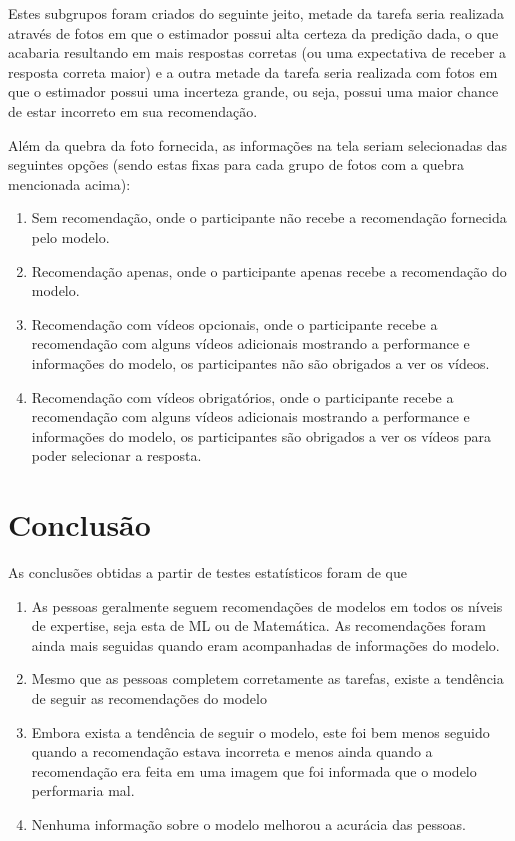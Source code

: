 \documentclass{article}
\begin{document}
Estes subgrupos foram criados do seguinte jeito, metade da tarefa seria realizada através de fotos em que o estimador possui alta certeza da predição dada, o que acabaria resultando em mais respostas corretas (ou uma expectativa de receber a resposta correta maior) e a outra metade da tarefa seria realizada com fotos em que o estimador possui uma incerteza grande, ou seja, possui uma maior chance de estar incorreto em sua recomendação.

Além da quebra da foto fornecida, as informações na tela seriam selecionadas das seguintes opções (sendo estas fixas para cada grupo de fotos com a quebra mencionada acima): 
\begin{enumerate}
    \item Sem recomendação, onde o participante não recebe a recomendação fornecida pelo modelo.
    \item Recomendação apenas, onde o participante apenas recebe a recomendação do modelo.
    \item Recomendação com vídeos opcionais, onde o participante recebe a recomendação com alguns vídeos adicionais mostrando a performance e informações do modelo, os participantes não são obrigados a ver os vídeos.
    \item Recomendação com vídeos obrigatórios, onde o participante recebe a recomendação com alguns vídeos adicionais mostrando a performance e informações do modelo, os participantes são obrigados a ver os vídeos para poder selecionar a resposta.
\end{enumerate}
\section{Conclusão}
As conclusões obtidas a partir de testes estatísticos foram de que
\begin{enumerate}
    \item As pessoas geralmente seguem recomendações de modelos em todos os níveis de expertise, seja esta de ML ou de Matemática. As recomendações foram ainda mais seguidas quando eram acompanhadas de informações do modelo.
    \item Mesmo que as pessoas completem corretamente as tarefas, existe a tendência de seguir as recomendações do modelo
    \item Embora exista a tendência de seguir o modelo, este foi bem menos seguido quando a recomendação estava incorreta e menos ainda quando a recomendação era feita em uma imagem que foi informada que o modelo performaria mal.
    \item Nenhuma informação sobre o modelo melhorou a acurácia das pessoas.
\end{enumerate}
\end{document}
